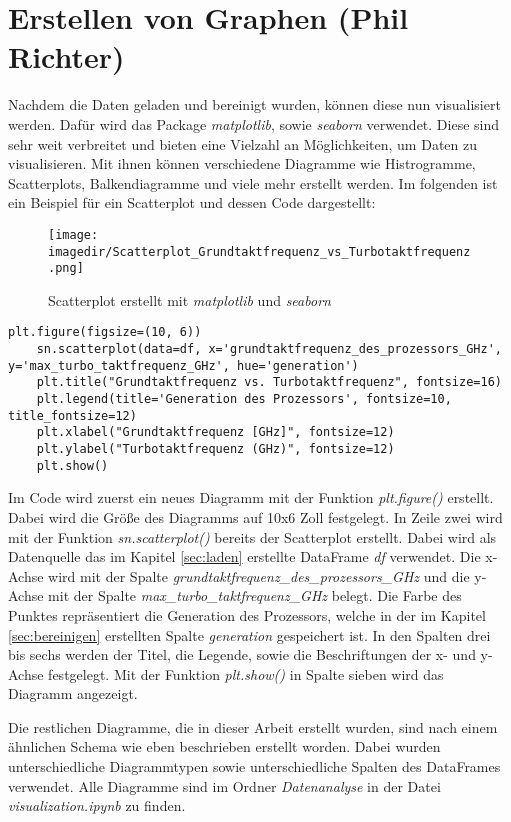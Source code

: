 \section{Erstellen von Graphen (Phil Richter)}
Nachdem die Daten geladen und bereinigt wurden, können diese nun visualisiert werden. Dafür wird das Package \textit{matplotlib}, sowie \textit{seaborn} verwendet.
Diese sind sehr weit verbreitet und bieten eine Vielzahl an Möglichkeiten, um Daten zu visualisieren. Mit ihnen können verschiedene Diagramme wie Histrogramme,
Scatterplots, Balkendiagramme und viele mehr erstellt werden. Im folgenden ist ein Beispiel für ein Scatterplot und dessen Code dargestellt:

\begin{figure}[H]
	\centering 
	\texttt{[image: \\imagedir/Scatterplot\_Grundtaktfrequenz\_vs\_Turbotaktfrequenz.png]} 
	\captionsetup{format=hang}
	\caption[Scatterplot]{\label{fig:scatterplot_Grundtaktfrequenz}Scatterplot erstellt mit \textit{matplotlib} und \textit{seaborn}}
\end{figure}

\begin{lstlisting}[caption={\texttt{Code für den Scatterplot in Figur 5.1}},captionpos=b]
    plt.figure(figsize=(10, 6))
    sn.scatterplot(data=df, x='grundtaktfrequenz_des_prozessors_GHz', y='max_turbo_taktfrequenz_GHz', hue='generation')
    plt.title("Grundtaktfrequenz vs. Turbotaktfrequenz", fontsize=16)
    plt.legend(title='Generation des Prozessors', fontsize=10, title_fontsize=12)
    plt.xlabel("Grundtaktfrequenz [GHz]", fontsize=12)
    plt.ylabel("Turbotaktfrequenz (GHz)", fontsize=12)
    plt.show()
\end{lstlisting}

Im Code wird zuerst ein neues Diagramm mit der Funktion \textit{plt.figure()} erstellt. Dabei wird die Größe des Diagramms auf 10x6 Zoll festgelegt. In Zeile
zwei wird mit der Funktion \textit{sn.scatterplot()} bereits der Scatterplot erstellt. Dabei wird als Datenquelle das im Kapitel \ref{sec:laden} erstellte DataFrame
\textit{df} verwendet. Die x-Achse wird mit der Spalte \textit{grundtaktfrequenz\_des\_prozessors\_GHz} und die y-Achse mit der Spalte \textit{max\_turbo\_taktfrequenz\_GHz}
belegt. Die Farbe des Punktes repräsentiert die Generation des Prozessors, welche in der im Kapitel \ref{sec:bereinigen} erstellten Spalte \textit{generation} gespeichert ist.
In den Spalten drei bis sechs werden der Titel, die Legende, sowie die Beschriftungen der x- und y-Achse festgelegt. Mit der Funktion \textit{plt.show()} in Spalte sieben wird
das Diagramm angezeigt.

Die restlichen Diagramme, die in dieser Arbeit erstellt wurden, sind nach einem ähnlichen Schema wie eben beschrieben erstellt worden. Dabei wurden unterschiedliche Diagrammtypen
sowie unterschiedliche Spalten des DataFrames verwendet. Alle Diagramme sind im Ordner \textit{Datenanalyse} in der Datei \textit{visualization.ipynb} zu finden.